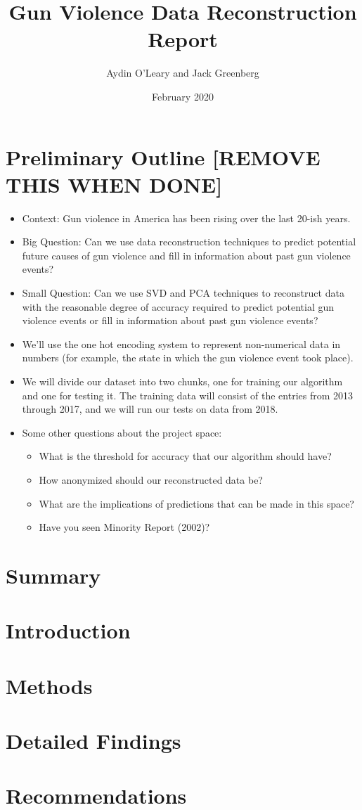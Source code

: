 \documentclass{article}
\title{Gun Violence Data Reconstruction Report}
\author{Aydin O'Leary and Jack Greenberg }
\date{February 2020}
\begin{document}
\maketitle

\section*{Preliminary Outline [REMOVE THIS WHEN DONE]}

\begin{itemize}
    \item Context: Gun violence in America has been rising over the last 20-ish years. \cite{website:cdc-data}
    \item Big Question: Can we use data reconstruction techniques to predict potential future causes of gun violence and fill in information about past gun violence events?
    \item Small Question: Can we use SVD and PCA techniques to reconstruct data with the reasonable degree of accuracy required to predict potential gun violence events or fill in information about past gun violence events?
    \item We'll use the one hot encoding system \cite{website:wikipedia_one-hot} to represent non-numerical data in numbers (for example, the state in which the gun violence event took place).
    \item We will divide our dataset into two chunks, one for training our algorithm and one for testing it. The training data will consist of the entries from 2013 through 2017, and we will run our tests on data from 2018.
    \item Some other questions about the project space: \begin{itemize}
        \item What is the threshold for accuracy that our algorithm should have?
        \item How anonymized should our reconstructed data be?
        \item What are the implications of predictions that can be made in this space?
        \item Have you seen Minority Report (2002)?
    \end{itemize}
\end{itemize}

\section*{Summary}
\section*{Introduction}
\section*{Methods}
\section*{Detailed Findings}
\section*{Recommendations}


 
\end{document}
